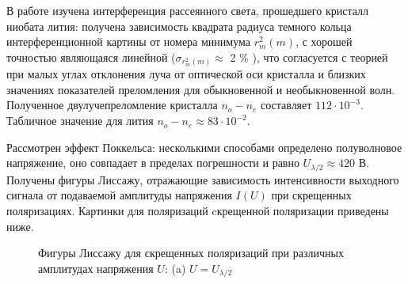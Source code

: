 \documentclass[15pt,a5paper,reqno]{article}
\begin{document}
	В работе изучена интерференция рассеянного света, прошедшего кристалл ниобата лития: получена зависимость квадрата радиуса темного кольца интерференционной картины от номера минимума $r_m^2(m)$, с хорошей точностью являющаяся линейной ($\sigma_{r_m^2(m)} \approx $ 2 \% ), что согласуется с теорией при малых углах отклонения луча от оптической оси кристалла и близких значениях показателей преломления для обыкновенной и необыкновенной волн. Полученное двулучепреломление кристалла $n_o - n_e$ составляет $112 \cdot 10^{-3} $. Табличное значение для лития $n_o - n_e \approx 83 \cdot 10^{-2}$. 
	
	Рассмотрен эффект Поккельса: несколькими способами определено полуволновое напряжение, оно совпадает в пределах погрешности и равно $U_{\lambda/2} \approx 420$ В. Получены фигуры Лиссажу, отражающие зависимость интенсивности выходного сигнала от подаваемой амплитуды напряжения $I(U)$ при скрещенных поляризациях. Картинки для поляризаций cкрещенной поляризации приведены ниже.
	
	
    	\begin{figure}
    	    \caption{Фигуры Лиссажу для скрещенных поляризаций при различных амплитудах напряжения $U$: (a) $U = U_{\lambda/2}$}
    	    \label{pic2}
    	\end{figure}
	
\end{document}
